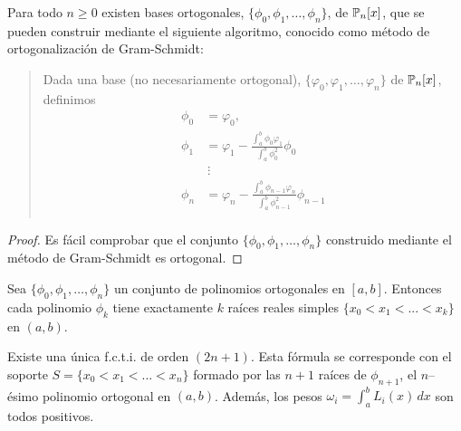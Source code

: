 \begin{proposition}
  Para todo $n\ge 0$ existen bases ortogonales,
  $\{\phi_0,\phi_1,\dots,\phi_n\}$, de $\operatorname{{\mathbb P}}_n[x]$, que se pueden
  construir mediante el siguiente algoritmo, conocido como método de
  ortogonalización de Gram-Schmidt:
  \begin{quotation}
    Dada una base (no necesariamente ortogonal),
    $\{\varphi_0,\varphi_1,\dots,\varphi_n\}$ de $\operatorname{{\mathbb P}}_n[x]$,
    definimos
    \begin{align*}
      \phi_0 &= \varphi_0,\\
      \phi_1 &= \varphi_1 -
      \frac{\int_a^b\phi_0\varphi_1}{\int_a^b\phi_0^2} \phi_0\\
      &\ \vdots\\
      \phi_n &= \varphi_n -
      \frac{\int_a^b\phi_{n-1}\varphi_n}{\int_a^b\phi_{n-1}^2} \phi_{n-1}\\
    \end{align*}
  \end{quotation}
\end{proposition}

\begin{proof}
  Es fácil comprobar que el conjunto $\{\phi_0,\phi_1,\dots,\phi_n\}$
  construido mediante el método de Gram-Schmidt es ortogonal.
\end{proof}


\begin{theorem}
  Sea $\{\phi_0,\phi_1,\dots,\phi_n\}$ un conjunto de polinomios
  ortogonales en $[a,b]$. Entonces cada polinomio $\phi_k$ tiene
  exactamente $k$ raíces reales simples $\{x_0<x_1<...<x_k\}$ en
  $(a,b)$.
\end{theorem}

\begin{theorem}
  Existe una única f.c.t.i. de orden $(2n+1)$. Esta fórmula se
  corresponde con el soporte $S=\{x_0<x_1<...<x_n\}$ formado por las
  $n+1$ raíces de $\phi_{n+1}$, el $n$--ésimo polinomio ortogonal en
  $(a,b)$. Además, los pesos $\omega_i=\int_a^b L_i(x)\, dx$ son todos
  positivos.
\end{theorem}

